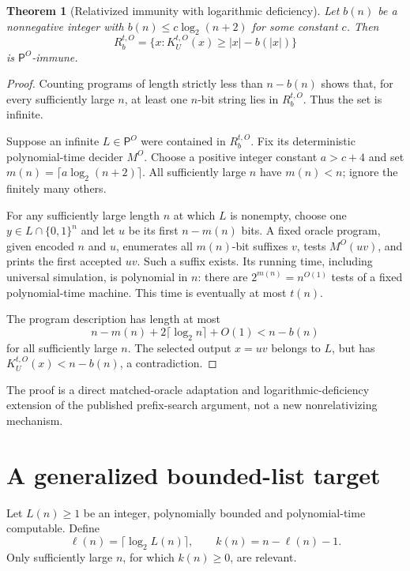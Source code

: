 \documentclass[11pt]{article}
\newtheorem{theorem}{Theorem}
\newcommand{\PP}{\mathsf P}
\begin{document}
\begin{theorem}[Relativized immunity with logarithmic deficiency]
Let $b(n)$ be a nonnegative integer with
$b(n)\le c\log_2(n+2)$ for some constant $c$. Then
\[
 R_b^{t,O}=\{x:K_U^{t,O}(x)\ge |x|-b(|x|)\}
\]
is $\PP^O$-immune.
\end{theorem}
\begin{proof}
Counting programs of length strictly less than $n-b(n)$ shows that,
for every sufficiently large $n$, at least one $n$-bit string lies in
$R_b^{t,O}$. Thus the set is infinite.

Suppose an infinite $L\in\PP^O$ were contained in $R_b^{t,O}$.
Fix its deterministic polynomial-time decider $M^O$.
Choose a positive integer constant $a>c+4$ and set
$m(n)=\lceil a\log_2(n+2)\rceil$.
All sufficiently large $n$ have $m(n)<n$; ignore the finitely many others.

For any sufficiently large length $n$ at which $L$ is nonempty, choose
one $y\in L\cap\{0,1\}^n$ and let $u$ be its first $n-m(n)$ bits.
A fixed oracle program, given encoded $n$ and $u$, enumerates all
$m(n)$-bit suffixes $v$, tests $M^O(uv)$, and prints the first accepted
$uv$. Such a suffix exists. Its running time, including universal
simulation, is polynomial in $n$: there are
$2^{m(n)}=n^{O(1)}$ tests of a fixed polynomial-time machine. This time
is eventually at most $t(n)$.

The program description has length at most
\[
 n-m(n)+2\lceil\log_2 n\rceil+O(1)
 <n-b(n)
\]
for all sufficiently large $n$. The selected output $x=uv$ belongs
to $L$, but has $K_U^{t,O}(x)<n-b(n)$, a contradiction.
\end{proof}

The proof is a direct matched-oracle adaptation and logarithmic-deficiency
extension of the published prefix-search argument, not a new
nonrelativizing mechanism.

\section{A generalized bounded-list target}
Let $L(n)\ge1$ be an integer, polynomially bounded and polynomial-time
computable. Define
\[
 \ell(n)=\lceil\log_2 L(n)\rceil,\qquad
 k(n)=n-\ell(n)-1.
\]
Only sufficiently large $n$, for which $k(n)\ge0$, are relevant.
\end{document}
